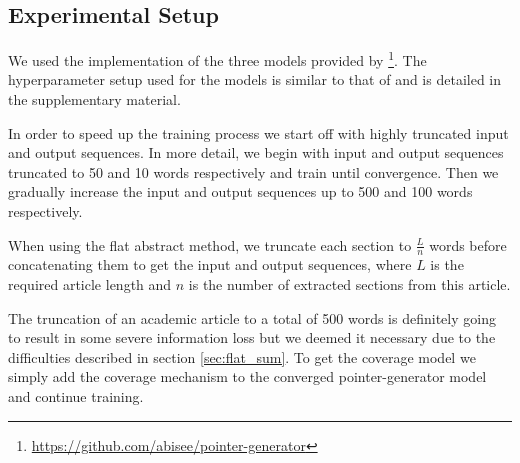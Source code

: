 \documentclass[runningheads]{llncs}
\begin{document}
\subsection{Experimental Setup}

We used the implementation of the three models provided by \cite{See2017GetNetworks}\footnote{\url{https://github.com/abisee/pointer-generator}}. The hyperparameter setup used for the models is similar to that of \cite{See2017GetNetworks} and is detailed in the supplementary material. 




In order to speed up the training process we start off with highly truncated input and output sequences. In more detail, we begin with input and output sequences truncated to 50 and 10 words respectively and train until convergence. Then we gradually increase the input and output sequences up to 500 and 100 words respectively.

When using the flat abstract method, we truncate each section to $\frac{L}{n}$ words before concatenating them to get the input and output sequences, where $L$ is the required article length and $n$ is the number of extracted sections from this article. 

The truncation of an academic article to a total of 500 words is definitely going to result in some severe information loss but we deemed it necessary due to the difficulties described in section \ref{sec:flat_sum}. To get the coverage model we simply add the coverage mechanism to the converged pointer-generator model and continue training.

\end{document}
